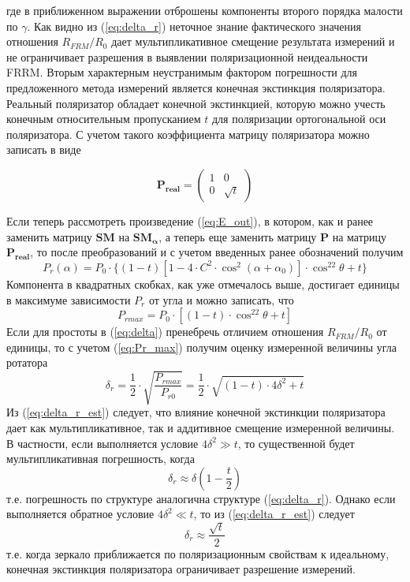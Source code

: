 \documentclass{article}
\begin{document}
где в приближенном выражении отброшены компоненты второго порядка малости по $\gamma$.
Как видно из (\ref{eq:delta_r}) неточное знание фактического значения отношения $R_{FRM}/R_0$ дает мультипликативное смещение результата измерений и не ограничивает разрешения в выявлении поляризационной неидеальности FRRM.
Вторым характерным неустранимым фактором погрешности для предложенного метода измерений является конечная экстинкция поляризатора. Реальный поляризатор обладает конечной экстинкцией, которую можно учесть конечным относительным пропусканием $t$ для поляризации ортогональной оси поляризатора. С учетом такого коэффициента матрицу поляризатора можно записать в виде      

\begin{equation}
	\bm{P_{real}} = 
	\begin{pmatrix}
		1 & 0 \\
		0 & \sqrt{t}
	\end{pmatrix}	
\end{equation}

Если теперь рассмотреть произведение (\ref{eq:E_out}), в котором, как и ранее заменить матрицу $\bm{SM}$ на $\bm{SM_\alpha}$, а теперь еще заменить матрицу $\bm{P}$ на матрицу $\bm{P_{real}}$, то после преобразований и с учетом введенных ранее обозначений получим
\begin{equation}
    P_r(\alpha)=P_0\cdot\{(1-t)\left[ 1-4\cdot C^2\cdot \cos^2(\alpha+\alpha_0) \right]\cdot \cos^22\theta+t \}
\end{equation}
Компонента в квадратных скобках, как уже отмечалось выше, достигает единицы в максимуме зависимости $P_r$ от угла и можно записать, что 
\begin{equation}
    \label{eq:Pr_max}
    P_{rmax}=P_0\cdot\left[(1-t)\cdot \cos^22\theta+t \right]
\end{equation}
Если для простоты в (\ref{eq:delta}) пренебречь отличием отношения $R_{FRM}/R_0 $ от единицы, то с учетом (\ref{eq:Pr_max}) получим оценку измеренной величины угла ротатора
\begin{equation}
    \label{eq:delta_r_est}
    \delta_r=\frac{1}{2}\cdot\sqrt{\frac{P_{rmax}}{P_{r0}}}=\frac{1}{2}\cdot\sqrt{(1-t)\cdot4\delta^2+t}
\end{equation}
Из (\ref{eq:delta_r_est}) следует, что влияние конечной экстинкции поляризатора дает как мультипликативное, так и аддитивное смещение измеренной величины. В частности, если выполняется условие $4\delta^2 \gg t$, то существенной будет мультипликативная погрешность, когда
\begin{equation}
    \delta_r\approx\delta\left(1-\frac{t}{2}\right)
\end{equation}
т.е. погрешность по структуре аналогична структуре (\ref{eq:delta_r}). Однако если выполняется обратное условие $4\delta^2\ll t$, то из (\ref{eq:delta_r_est}) следует
\begin{equation}
    \delta_r\approx\frac{\sqrt{t}}{2}
\end{equation}
т.е. когда зеркало приближается по поляризационным свойствам к идеальному, конечная экстинкция поляризатора ограничивает разрешение измерений.
\end{document}
